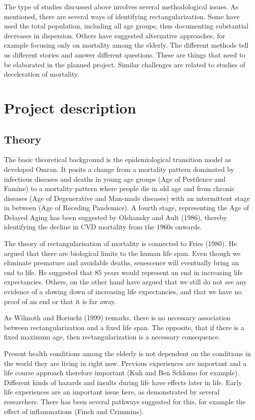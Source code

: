 \documentclass[a4paper,12pt]{article}
\begin{document}
The type of studies discussed above involves several methodological
issues. As mentioned, there are several ways of identifying
rectangularization. Some have used the total population, including all age
groups, thus documenting substantial decreases in dispersion. Others have
suggested alternative approaches, for example focusing only on mortality
among the elderly. The different methods tell us different stories and
answer different questions. These are things that need to be elaborated in
the planned project. Similar challenges are related to studies of
deceleration of mortality.  

\section{Project description}

\subsection{Theory}

The basic theoretical background is the epidemiological transition model as
developed Omran. It posits a change from a mortality pattern dominated by
infectious diseases and deaths in young age groups (Age of Pestilence and
Famine) to a mortality pattern where people die in old age and from chronic
diseases (Age of Degenerative and Man-made diseases) with an intermittent
stage in between (Age of Receding Pandemics). A fourth stage, representing
the Age of Delayed Aging has been suggested by Olshansky and Ault (1986),
thereby identifying the decline in CVD mortality from the 1960s onwards.  

The theory of rectangularisation of mortality is connected to Fries
(1980). He argued that there are biological limits to the human life
span. Even though we eliminate premature and avoidable deaths, senescence
will eventually bring an end to life. He suggested that 85 years would
represent an end in increasing life expectancies. Others, on the other hand
have argued that we still do not see any evidence of a slowing down of
increasing life expectancies, and that we have no proof of an end or that
it is far away. 
 
As Wilmoth and Horiuchi (1999) remarks, there is no necessary association
between rectangularization and a fixed life span. The opposite, that if
there is a fixed maximum age, then rectangularization is a necessary
consequence. 

Present health conditions among the elderly is not dependent on the
conditions in the world they are living in right now. Previous experiences
are important and a life course approach therefore important (Kuh and Ben
Schlomo for example). Different kinds of hazards and insults during life
have effects later in life. Early life experiences are an important issue
here, as demonstrated by several researchers. There has been several
pathways suggested for this, for example the effect of inflammations (Finch
and Crimmins).
\end{document}
